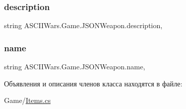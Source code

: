 \hypertarget{class_a_s_c_i_i_wars_1_1_game_1_1_j_s_o_n_weapon_af8f05b5ec58b19bf2a2d78fade7abd40}{}\label{class_a_s_c_i_i_wars_1_1_game_1_1_j_s_o_n_weapon_af8f05b5ec58b19bf2a2d78fade7abd40} 
\subsubsection{\texorpdfstring{description}{description}}
{\footnotesize\ttfamily string A\+S\+C\+I\+I\+Wars.\+Game.\+J\+S\+O\+N\+Weapon.\+description\hspace{0.3cm}{\ttfamily [get]}, {\ttfamily [set]}}

\hypertarget{class_a_s_c_i_i_wars_1_1_game_1_1_j_s_o_n_weapon_a66a5d6b4e9584f26f9b8a966ac98ddc0}{}\label{class_a_s_c_i_i_wars_1_1_game_1_1_j_s_o_n_weapon_a66a5d6b4e9584f26f9b8a966ac98ddc0} 
\subsubsection{\texorpdfstring{name}{name}}
{\footnotesize\ttfamily string A\+S\+C\+I\+I\+Wars.\+Game.\+J\+S\+O\+N\+Weapon.\+name\hspace{0.3cm}{\ttfamily [get]}, {\ttfamily [set]}}



Объявления и описания членов класса находятся в файле\+:\begin{DoxyCompactItemize}
\item 
Game/\hyperlink{_items_8cs}{Items.\+cs}\end{DoxyCompactItemize}
